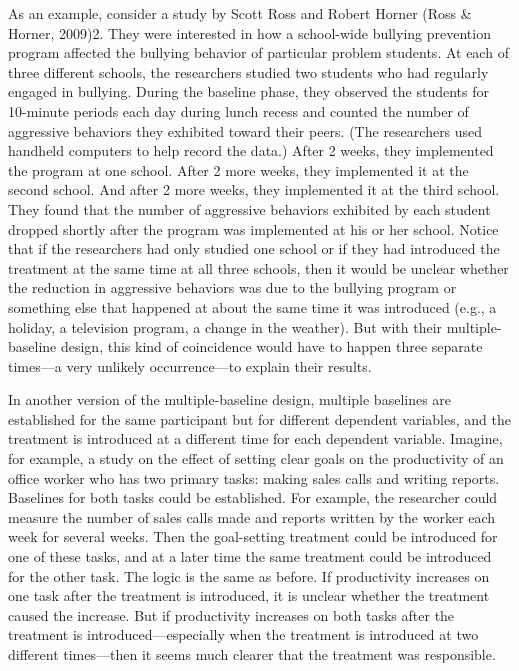 As an example, consider a study by Scott Ross and Robert Horner (Ross \& Horner, 2009)2. They were interested in how a school-wide bullying prevention program affected the bullying behavior of particular problem students. At
each of three different schools, the researchers studied two students who had regularly engaged in bullying. During the baseline phase, they observed the students for 10-minute periods each day during lunch recess and counted the number of aggressive behaviors they exhibited toward their peers. (The researchers used handheld computers to help record the data.) After 2 weeks, they implemented the program at one school. After 2 more weeks, they implemented it at the second school. And after 2 more weeks, they implemented it at the third school. They found that the number of aggressive behaviors exhibited by each student dropped shortly after the program was implemented at his or her school. Notice that if the researchers had only studied one school or if they had introduced the treatment at the same time at all three schools, then it would be unclear whether the reduction in aggressive behaviors was due to the bullying program or something else that happened at about the same time it was introduced (e.g., a holiday, a television program, a change in the weather). But with their multiple-baseline design, this kind of coincidence would have to happen three separate times---a very unlikely occurrence---to explain their results.

In another version of the multiple-baseline design, multiple baselines are established for the same participant but for different dependent variables, and the treatment is introduced at a different time for each dependent variable. Imagine, for example, a study on the effect of setting clear goals on the productivity of an office worker who has two primary tasks: making sales calls and writing reports. Baselines for both tasks could be established. For example, the researcher could measure the number of sales calls made and reports written by the worker each week for several weeks. Then the goal-setting treatment could be introduced for one of these tasks, and at a later time the same treatment could be introduced for the other task. The logic is the same as before. If productivity increases on one task after the treatment is introduced, it is unclear whether the treatment caused the increase. But if productivity increases on both tasks after the treatment is introduced---especially when the treatment is introduced at two different times---then it seems much clearer that the treatment was responsible.

